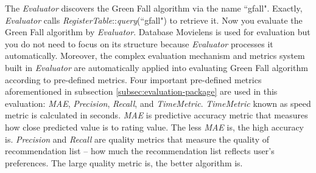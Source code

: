 \documentclass[a4paper,twoside]{article}
\begin{document}
The \textit{Evaluator} discovers the Green Fall algorithm via the name ``gfall". Exactly, \textit{Evaluator} calls \textit{RegisterTable}::\textit{query}(``gfall") to retrieve it. Now you evaluate the Green Fall algorithm by \textit{Evaluator}. Database Movielens \cite{movielens} is used for evaluation but you do not need to focus on its structure because \textit{Evaluator} processes it automatically. Moreover, the complex evaluation mechanism and metrics system built in \textit{Evaluator} are automatically applied into evaluating Green Fall algorithm according to pre-defined metrics. Four important pre-defined metrics aforementioned in subsection \ref{subsec:evaluation-package} are used in this evaluation: \textit{MAE}, \textit{Precision}, \textit{Recall}, and \textit{TimeMetric}. \textit{TimeMetric} known as speed metric is calculated in seconds. \textit{MAE} is predictive accuracy metric that measures how close predicted value is to rating value. The less \textit{MAE} is, the high accuracy is. \textit{Precision} and \textit{Recall} are quality metrics that measure the quality of recommendation list – how much the recommendation list reflects user's preferences. The large quality metric is, the better algorithm is.
\end{document}
